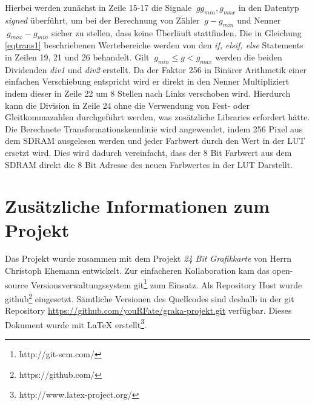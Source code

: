\documentclass[%
  paper=A4, %
  pagesize, %
  12pt,
  ngerman   %
]{scrreprt}  %
\begin{document}
Hierbei werden zunächst in Zeile 15-17 die Signale $\ g g_{min}, g_{max}$ in den Datentyp \emph{signed} überführt, um bei der Berechnung von Zähler $\ g-g_{min} $ und Nenner $\ g_{max} - g_{min} $ sicher zu stellen, dass keine Überläuft stattfinden. Die in Gleichung \ref{eqtrans1} beschriebenen Wertebereiche werden von den \emph{if, elsif, else} Statements in Zeilen 19, 21 und 26 behandelt. Gilt  $\ g_{min} \leq g < g_{max}$ werden die beiden Dividenden \emph{div1} und \emph{div2} erstellt. Da der Faktor 256 in Binärer Arithmetik einer einfachen Verschiebung entspricht wird er direkt in den Nenner Multipliziert indem dieser in Zeile 22 um 8 Stellen nach Links verschoben wird. Hierdurch kann die Division in Zeile 24 ohne die Verwendung von Fest- oder Gleitkommazahlen durchgeführt werden, was zusätzliche Libraries erfordert hätte.\\
Die Berechnete Transformationskennlinie wird angewendet, indem  256 Pixel aus dem SDRAM ausgelesen werden und jeder Farbwert durch den Wert in der LUT ersetzt wird. Dies wird dadurch vereinfacht, dass der 8 Bit Farbwert aus dem SDRAM direkt die 8 Bit Adresse des neuen Farbwertes in der LUT Darstellt.



\chapter{Zusätzliche Informationen zum Projekt}
Das Projekt wurde zusammen mit dem Projekt \emph{24 Bit Grafikkarte} von Herrn Christoph Ehemann entwickelt. Zur einfacheren Kollaboration kam das open-source Versionsverwaltungssystem git\footnote{http://git-scm.com/} zum Einsatz. Als Repository Host wurde github\footnote{https://github.com/} eingesetzt. Sämtliche Versionen des Quellcodes sind deshalb in der git Repository \url{https://github.com/youRFate/graka-projekt.git} verfügbar. Dieses Dokument wurde mit \LaTeX{} erstellt\footnote{http://www.latex-project.org/}.
\end{document}
